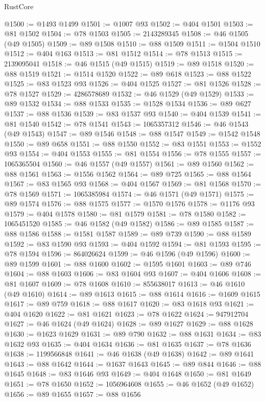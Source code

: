 \begin{lexlean}{RustCore}
\begin{coremodule}
@1500 := @1493 @1499
@1501 := @1007 @93
@1502 := @404 @1501
@1503 := @81 @1502
@1504 := @78 @1503
@1505 := 2143289345
@1508 := @46 @1505 (@49 @1505)
@1509 := @89 @1508
@1510 := @88 @1509
@1511 := @1504 @1510
@1512 := @404 @163
@1513 := @81 @1512
@1514 := @78 @1513
@1515 := 2139095041
@1518 := @46 @1515 (@49 @1515)
@1519 := @89 @1518
@1520 := @88 @1519
@1521 := @1514 @1520
@1522 := @89 @618
@1523 := @88 @1522
@1525 := @83 @1523 @93
@1526 := @404 @1525
@1527 := @81 @1526
@1528 := @78 @1527
@1529 := 4286578689
@1532 := @46 @1529 (@49 @1529)
@1533 := @89 @1532
@1534 := @88 @1533
@1535 := @1528 @1534
@1536 := @89 @627
@1537 := @88 @1536
@1539 := @83 @1537 @93
@1540 := @404 @1539
@1541 := @81 @1540
@1542 := @78 @1541
@1543 := 1065357312
@1546 := @46 @1543 (@49 @1543)
@1547 := @89 @1546
@1548 := @88 @1547
@1549 := @1542 @1548
@1550 := @89 @658
@1551 := @88 @1550
@1552 := @83 @1551
@1553 := @1552 @93
@1554 := @404 @1553
@1555 := @81 @1554
@1556 := @78 @1555
@1557 := 1065365504
@1560 := @46 @1557 (@49 @1557)
@1561 := @89 @1560
@1562 := @88 @1561
@1563 := @1556 @1562
@1564 := @89 @725
@1565 := @88 @1564
@1567 := @83 @1565 @93
@1568 := @404 @1567
@1569 := @81 @1568
@1570 := @78 @1569
@1571 := 1065385984
@1574 := @46 @1571 (@49 @1571)
@1575 := @89 @1574
@1576 := @88 @1575
@1577 := @1570 @1576
@1578 := @1176 @93
@1579 := @404 @1578
@1580 := @81 @1579
@1581 := @78 @1580
@1582 := 1065451520
@1585 := @46 @1582 (@49 @1582)
@1586 := @89 @1585
@1587 := @88 @1586
@1588 := @1581 @1587
@1589 := @89 @739
@1590 := @88 @1589
@1592 := @83 @1590 @93
@1593 := @404 @1592
@1594 := @81 @1593
@1595 := @78 @1594
@1596 := 864026624
@1599 := @46 @1596 (@49 @1596)
@1600 := @89 @1599
@1601 := @88 @1600
@1602 := @1595 @1601
@1603 := @89 @746
@1604 := @88 @1603
@1606 := @83 @1604 @93
@1607 := @404 @1606
@1608 := @81 @1607
@1609 := @78 @1608
@1610 := 855638017
@1613 := @46 @1610 (@49 @1610)
@1614 := @89 @1613
@1615 := @88 @1614
@1616 := @1609 @1615
@1617 := @89 @759
@1618 := @88 @1617
@1620 := @83 @1618 @93
@1621 := @404 @1620
@1622 := @81 @1621
@1623 := @78 @1622
@1624 := 947912704
@1627 := @46 @1624 (@49 @1624)
@1628 := @89 @1627
@1629 := @88 @1628
@1630 := @1623 @1629
@1631 := @89 @790
@1632 := @88 @1631
@1634 := @83 @1632 @93
@1635 := @404 @1634
@1636 := @81 @1635
@1637 := @78 @1636
@1638 := 1199566848
@1641 := @46 @1638 (@49 @1638)
@1642 := @89 @1641
@1643 := @88 @1642
@1644 := @1637 @1643
@1645 := @89 @844
@1646 := @88 @1645
@1648 := @83 @1646 @93
@1649 := @404 @1648
@1650 := @81 @1649
@1651 := @78 @1650
@1652 := 1056964608
@1655 := @46 @1652 (@49 @1652)
@1656 := @89 @1655
@1657 := @88 @1656

\end{coremodule}
\end{lexlean}
